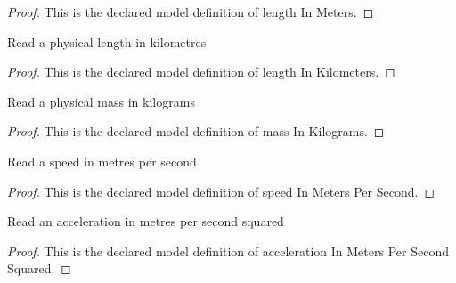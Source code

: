 \begin{proof}
  This is the declared model definition of length In Meters.
\end{proof}
\begin{definition}
  \label{def:physics:phyx-mini-0715:phyxminiproblems-problemphyxmini0715-lengthinkilometers}
  Read a physical length in kilometres
\end{definition}
\begin{proof}
  This is the declared model definition of length In Kilometers.
\end{proof}
\begin{definition}
  \label{def:physics:phyx-mini-0715:phyxminiproblems-problemphyxmini0715-massinkilograms}
  Read a physical mass in kilograms
\end{definition}
\begin{proof}
  This is the declared model definition of mass In Kilograms.
\end{proof}
\begin{definition}
  \label{def:physics:phyx-mini-0715:phyxminiproblems-problemphyxmini0715-speedinmeterspersecond}
  Read a speed in metres per second
\end{definition}
\begin{proof}
  This is the declared model definition of speed In Meters Per Second.
\end{proof}
\begin{definition}
  \label{def:physics:phyx-mini-0715:phyxminiproblems-problemphyxmini0715-accelerationinmeterspersecondsquared}
  Read an acceleration in metres per second squared
\end{definition}
\begin{proof}
  This is the declared model definition of acceleration In Meters Per Second Squared.
\end{proof}
